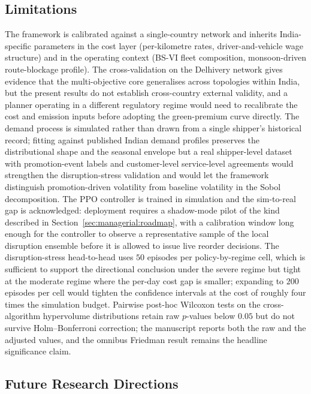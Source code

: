 \documentclass[review,preprint,authoryear,12pt]{elsarticle}
\begin{document}
\subsection{Limitations}
\label{sec:conclusions:limitations}

The framework is calibrated against a single-country network and
inherits India-specific parameters in the cost layer (per-kilometre
rates, driver-and-vehicle wage structure) and in the operating
context (BS-VI fleet composition, monsoon-driven route-blockage
profile). The cross-validation on the Delhivery network gives
evidence that the multi-objective core generalises across topologies
within India, but the present results do not establish cross-country
external validity, and a planner operating in a different regulatory
regime would need to recalibrate the cost and emission inputs before
adopting the green-premium curve directly. The demand process is
simulated rather than drawn from a single shipper's historical
record; fitting against published Indian demand profiles preserves
the distributional shape and the seasonal envelope but a real
shipper-level dataset with promotion-event labels and customer-level
service-level agreements would strengthen the disruption-stress
validation and would let the framework distinguish promotion-driven
volatility from baseline volatility in the Sobol decomposition. The
PPO controller is trained in simulation and the sim-to-real gap is
acknowledged: deployment requires a shadow-mode pilot of the kind
described in Section~\ref{sec:managerial:roadmap}, with a
calibration window long enough for the controller to observe a
representative sample of the local disruption ensemble before it is
allowed to issue live reorder decisions. The disruption-stress
head-to-head uses $50$ episodes per policy-by-regime cell, which is
sufficient to support the directional conclusion under the severe
regime but tight at the moderate regime where the per-day cost gap
is smaller; expanding to $200$ episodes per cell would tighten the
confidence intervals at the cost of roughly four times the simulation
budget. Pairwise post-hoc Wilcoxon tests on the cross-algorithm
hypervolume distributions retain raw $p$-values below $0.05$ but do
not survive Holm--Bonferroni correction; the manuscript reports both
the raw and the adjusted values, and the omnibus Friedman result
remains the headline significance claim.

\subsection{Future Research Directions}
\label{sec:conclusions:future}
\end{document}
